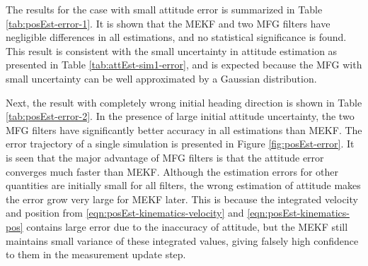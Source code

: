 The results for the case with small attitude error is summarized in Table \ref{tab:posEst-error-1}.
It is shown that the MEKF and two MFG filters have negligible differences in all estimations, and no statistical significance is found.
This result is consistent with the small uncertainty in attitude estimation as presented in Table \ref{tab:attEst-sim1-error}, and is expected because the MFG with small uncertainty can be well approximated by a Gaussian distribution.

Next, the result with completely wrong initial heading direction is shown in Table \ref{tab:posEst-error-2}.
In the presence of large initial attitude uncertainty, the two MFG filters have significantly better accuracy in all estimations than MEKF.
The error trajectory of a single simulation is presented in Figure \ref{fig:posEst-error}.
It is seen that the major advantage of MFG filters is that the attitude error converges much faster than MEKF.
Although the estimation errors for other quantities are initially small for all filters, the wrong estimation of attitude makes the error grow very large for MEKF later.
This is because the integrated velocity and position from \eqref{eqn:posEst-kinematics-velocity} and \eqref{eqn:posEst-kinematics-pos} contains large error due to the inaccuracy of attitude, but the MEKF still maintains small variance of these integrated values, giving falsely high confidence to them in the measurement update step.

